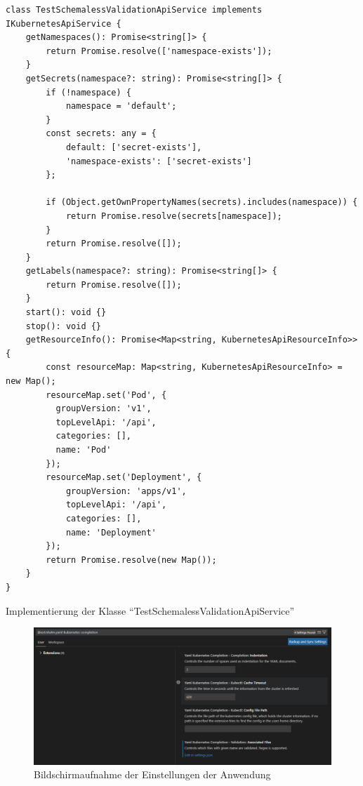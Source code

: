 \begin{listing}[H]
  \begin{verbatim}
class TestSchemalessValidationApiService implements IKubernetesApiService {
    getNamespaces(): Promise<string[]> {
        return Promise.resolve(['namespace-exists']);
    }
    getSecrets(namespace?: string): Promise<string[]> {
        if (!namespace) {
            namespace = 'default';
        }
        const secrets: any = {
            default: ['secret-exists'],
            'namespace-exists': ['secret-exists']
        };

        if (Object.getOwnPropertyNames(secrets).includes(namespace)) {
            return Promise.resolve(secrets[namespace]);
        }
        return Promise.resolve([]);
    }
    getLabels(namespace?: string): Promise<string[]> {
        return Promise.resolve([]);
    }
    start(): void {}
    stop(): void {}
    getResourceInfo(): Promise<Map<string, KubernetesApiResourceInfo>> {
        const resourceMap: Map<string, KubernetesApiResourceInfo> = new Map();
        resourceMap.set('Pod', { 
          groupVersion: 'v1', 
          topLevelApi: '/api', 
          categories: [], 
          name: 'Pod' 
        });
        resourceMap.set('Deployment', {
            groupVersion: 'apps/v1',
            topLevelApi: '/api',
            categories: [],
            name: 'Deployment'
        });
        return Promise.resolve(new Map());
    }
}
  \end{verbatim}
  \caption{Implementierung der Klasse ``TestSchemalessValidationApiService''}
  \label{lst:implementation-test-schemaless-validation-service}
\end{listing}


\begin{figure}[htp] %
  \centering
  \includegraphics[width=1.0\textwidth]{images/screenshot-settings.png} %
  \caption{Bildschirmaufnahme der Einstellungen der Anwendung}
  \label{fig:screenshot-settings}
\end{figure}

